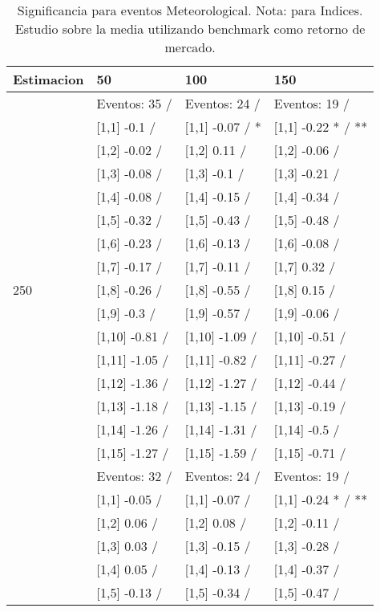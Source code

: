 \begin{table}

\caption{Significancia para eventos Meteorological. Nota: para Indices. Estudio sobre la media utilizando benchmark como retorno de mercado.}
\centering
\begin{tabular}[t]{llll}
\toprule
Estimacion & 50 & 100 & 150\\
\midrule
 & Eventos:  35 / & Eventos:  24 / & Eventos:  19 /\\
 & {}[1,1] -0.1  / & {}[1,1] -0.07  / * & {}[1,1] -0.22 * / **\\
 & {}[1,2] -0.02  / & {}[1,2] 0.11  / & {}[1,2] -0.06  /\\
 & {}[1,3] -0.08  / & {}[1,3] -0.1  / & {}[1,3] -0.21  /\\
 & {}[1,4] -0.08  / & {}[1,4] -0.15  / & {}[1,4] -0.34  /\\
\addlinespace
 & {}[1,5] -0.32  / & {}[1,5] -0.43  / & {}[1,5] -0.48  /\\
 & {}[1,6] -0.23  / & {}[1,6] -0.13  / & {}[1,6] -0.08  /\\
 & {}[1,7] -0.17  / & {}[1,7] -0.11  / & {}[1,7] 0.32  /\\
250 & {}[1,8] -0.26  / & {}[1,8] -0.55  / & {}[1,8] 0.15  /\\
 & {}[1,9] -0.3  / & {}[1,9] -0.57  / & {}[1,9] -0.06  /\\
\addlinespace
 & {}[1,10] -0.81  / & {}[1,10] -1.09  / & {}[1,10] -0.51  /\\
 & {}[1,11] -1.05  / & {}[1,11] -0.82  / & {}[1,11] -0.27  /\\
 & {}[1,12] -1.36  / & {}[1,12] -1.27  / & {}[1,12] -0.44  /\\
 & {}[1,13] -1.18  / & {}[1,13] -1.15  / & {}[1,13] -0.19  /\\
 & {}[1,14] -1.26  / & {}[1,14] -1.31  / & {}[1,14] -0.5  /\\
\addlinespace
 & {}[1,15] -1.27  / & {}[1,15] -1.59  / & {}[1,15] -0.71  /\\
 & Eventos:  32 / & Eventos:  24 / & Eventos:  19 /\\
 & {}[1,1] -0.05  / & {}[1,1] -0.07  / & {}[1,1] -0.24 * / **\\
 & {}[1,2] 0.06  / & {}[1,2] 0.08  / & {}[1,2] -0.11  /\\
 & {}[1,3] 0.03  / & {}[1,3] -0.15  / & {}[1,3] -0.28  /\\
\addlinespace
 & {}[1,4] 0.05  / & {}[1,4] -0.13  / & {}[1,4] -0.37  /\\
 & {}[1,5] -0.13  / & {}[1,5] -0.34  / & {}[1,5] -0.47  /\\

\end{tabular}
\end{table}
